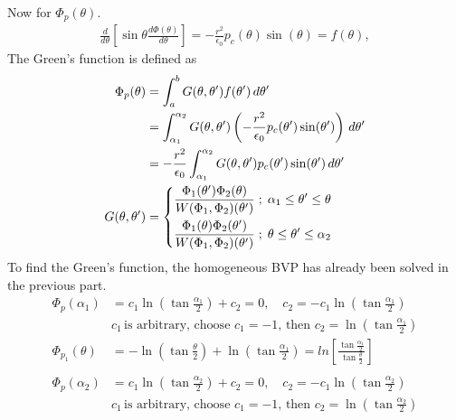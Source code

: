\documentclass{article}
\begin{document}
{		Now for $\Phi_p(\theta)$.
		\begin{equation*}
			\begin{split}
				\frac{d}{d\theta} \left[ \sin \theta \frac{d \Phi(\theta)}{d\theta} \right] =  -\frac{r^2}{\epsilon_0} p_c(\theta) \sin (\theta) = f(\theta),
			\end{split}
		\end{equation*}
		The Green's function is defined as
		\begin{equation*}
			\begin{split}
				\Phi_p(\theta) &= \int_{a}^{b} G(\theta, \theta') f(\theta') \, d\theta' \\
				&= \int_{\alpha_1}^{\alpha_2} G(\theta, \theta') \left( -\frac{r^2}{\epsilon_0} p_c(\theta') \sin (\theta') \right) \, d\theta' \\
				&= - \frac{r^2}{\epsilon_0} \int_{\alpha_1}^{\alpha_2} G(\theta, \theta') p_c(\theta') \sin (\theta') \, d\theta' \\
				G(\theta,\theta') &=
				\begin{dcases}
					\frac{\Phi_1 (\theta') \Phi_2 (\theta)}{W(\Phi_1, \Phi_2)(\theta')} \; ; \; \alpha_1 \leq \theta' \leq \theta \\
					\frac{\Phi_1 (\theta) \Phi_2 (\theta')}{W(\Phi_1, \Phi_2)(\theta')} \; ; \; \theta \leq \theta' \leq \alpha_2
				\end{dcases}
			\end{split}
		\end{equation*}
		To find the Green's function, the homogeneous BVP has already been solved in the previous part.
		\begin{equation*}
			\begin{split}
				\Phi_p(\alpha_1) &= c_1 \ln(\tan \tfrac{\alpha_1}{2}) + c_2 = 0, \quad c_2 = -c_1 \ln(\tan \tfrac{\alpha_1}{2}) \\
				&c_1 \, \text{is arbitrary, choose } c_1 = -1, \, \text{then } c_2 = \ln(\tan \tfrac{\alpha_1}{2}) \\
				\Phi_{p_1}(\theta) &= -\ln(\tan \tfrac{\theta}{2}) + \ln(\tan \tfrac{\alpha_1}{2}) = ln\left[ \tfrac{\tan \tfrac{\alpha_1}{2}}{\tan \tfrac{\theta}{2}} \right] \\
				\\
				\Phi_p(\alpha_2) &= c_1 \ln(\tan \tfrac{\alpha_2}{2}) + c_2 = 0, \quad c_2 = -c_1 \ln(\tan \tfrac{\alpha_2}{2}) \\
				&c_1 \, \text{is arbitrary, choose } c_1 = -1, \, \text{then } c_2 = \ln(\tan \tfrac{\alpha_2}{2}) \\

\end{split}
\end{equation*}}
\end{document}
